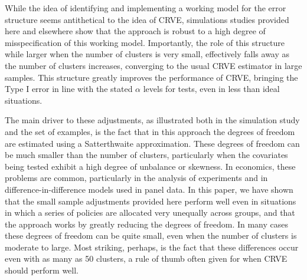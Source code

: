 \documentclass[12pt]{article}\usepackage[]{graphicx}\usepackage[]{color}
\begin{document}
While the idea of identifying and implementing a working model for the error structure seems antithetical to the idea of CRVE, simulations studies provided here and elsewhere show that the approach is robust to a high degree of misspecification of this working model.
Importantly, the role of this structure while larger when the number of clusters is very small, effectively falls away as the number of clusters increases, converging to the usual CRVE estimator in large samples.
This structure greatly improves the performance of CRVE, bringing the Type I error in line with the stated $\alpha$ levels for tests, even in less than ideal situations.

The main driver to these adjustments, as illustrated both in the simulation study and the set of examples, is the fact that in this approach the degrees of freedom are estimated using a Satterthwaite approximation.
These degrees of freedom can be much smaller than the number of clusters, particularly when the covariates being tested exhibit a high degree of unbalance or skewness.
In economics, these problems are common, particularly in the analysis of experiments and in difference-in-difference models used in panel data. 
In this paper, we have shown that the small sample adjustments provided here perform well even in situations in which a series of policies are allocated very unequally across groups, and that the approach works by greatly reducing the degrees of freedom.
In many cases these degrees of freedom can be quite small, even when the number of clusters is moderate to large.
Most striking, perhaps, is the fact that these differences occur even with as many as 50 clusters, a rule of thumb often given for when CRVE should perform well.




\end{document}

